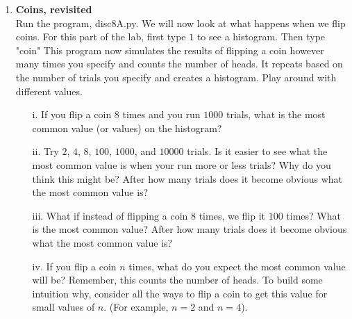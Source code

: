 \documentclass[11pt]{article}
\newif\ifsolutions
\begin{document}
\begin{enumerate}


\item {\bf Coins, revisited}   \\
Run the program, disc8A.py. We will now look at what happens when we flip coins. For this part of the lab, first type $1$ to see a histogram. Then type "coin" This program now simulates the results of flipping a coin however many times you specify and counts the number of heads. It repeats based on the number of trials you specify and creates a histogram. Play around with different values.

\ifsolutions
{\color{blue}{Motivation: have students see the LLN in action, how adding more trials makes all these distributions look visually more like a normal distribution. Also, if they have matplotlib installed they can uncomment the relevant lines to get better looking histograms.
}}
\fi

\begin{enumerate}
\item[i.] If you flip a coin $8$ times and you run $1000$ trials, what is the most common value (or values) on the histogram? 

\ifsolutions
{\color{blue}{Solution: usually 4
}}
\fi

\item[ii.] Try $2$, $4$, $8$, $100$, $1000$, and $10000$ trials. Is it easier to see what the most common value is when your run more or less trials?  Why do you think this might be? After how many trials does it become obvious what the most common value is?

\ifsolutions
{\color{blue}{Solution: after about 100 trials we begin to see 4 as the most common value.
}}
\fi

\item[iii.] What if instead of flipping a coin $8$ times, we flip it $100$ times? What is the most common value? After how many trials does it become obvious what the most common value is?

\ifsolutions
{\color{blue}{Solution: most common value is 50.
}}
\fi

\item[iv.] If you flip a coin $n$ times, what do you expect the most common value will be? Remember, this counts the number of heads. To build some intuition why, consider all the ways to flip a coin to get this value for small values of $n$. (For example, $n = 2$ and $n = 4$).

\ifsolutions
{\color{blue}{Solution: most common value should be $n/2$ for a sufficient number of trials. If we flip a coin twice ($n=2$), the options are HH, HT, TH, and TT. So half the time we should see the most common value be 1 H.
}}
\fi


\end{enumerate}
\end{enumerate}
\end{document}
